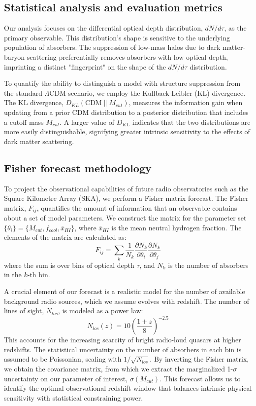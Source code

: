 \documentclass[]{article}
\begin{document}
\subsection{Statistical analysis and evaluation metrics}

Our analysis focuses on the differential optical depth distribution, $dN/d\tau$, as the primary observable. This distribution's shape is sensitive to the underlying population of absorbers. The suppression of low-mass halos due to dark matter-baryon scattering preferentially removes absorbers with low optical depth, imprinting a distinct "fingerprint" on the shape of the $dN/d\tau$ distribution.

To quantify the ability to distinguish a model with structure suppression from the standard $\Lambda$CDM scenario, we employ the Kullback-Leibler (KL) divergence. The KL divergence, $D_{KL}(\text{CDM} \parallel M_{cut})$, measures the information gain when updating from a prior CDM distribution to a posterior distribution that includes a cutoff mass $M_{cut}$. A larger value of $D_{KL}$ indicates that the two distributions are more easily distinguishable, signifying greater intrinsic sensitivity to the effects of dark matter scattering.

\subsection{Fisher forecast methodology}

To project the observational capabilities of future radio observatories such as the Square Kilometre Array (SKA), we perform a Fisher matrix forecast. The Fisher matrix, $F_{ij}$, quantifies the amount of information that an observable contains about a set of model parameters. We construct the matrix for the parameter set $\{\theta_i\} = \{M_{cut}, f_{cool}, \bar{x}_{HI}\}$, where $\bar{x}_{HI}$ is the mean neutral hydrogen fraction. The elements of the matrix are calculated as:
\begin{equation}
F_{ij} = \sum_{k} \frac{1}{N_k} \frac{\partial N_k}{\partial \theta_i} \frac{\partial N_k}{\partial \theta_j}
\end{equation}
where the sum is over bins of optical depth $\tau$, and $N_k$ is the number of absorbers in the $k$-th bin.

A crucial element of our forecast is a realistic model for the number of available background radio sources, which we assume evolves with redshift. The number of lines of sight, $N_{los}$, is modeled as a power law:
\begin{equation}
N_{los}(z) = 10 \left( \frac{1+z}{8} \right)^{-2.5}
\end{equation}
This accounts for the increasing scarcity of bright radio-loud quasars at higher redshifts. The statistical uncertainty on the number of absorbers in each bin is assumed to be Poissonian, scaling with $1/\sqrt{N_{los}}$. By inverting the Fisher matrix, we obtain the covariance matrix, from which we extract the marginalized 1-$\sigma$ uncertainty on our parameter of interest, $\sigma(M_{cut})$. This forecast allows us to identify the optimal observational redshift window that balances intrinsic physical sensitivity with statistical constraining power.
\end{document}
